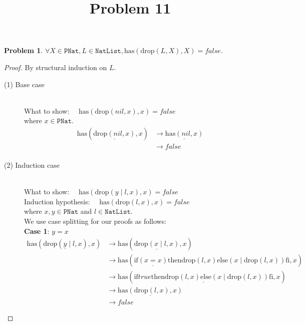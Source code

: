 \documentclass[12pt, a4paper]{article}
\title{Problem 11}
\date{\vspace{-5ex}}
\newtheorem{problem}{Problem}
\newcommand{\rel}[1]{\mathrel{#1}}
\newcommand{\rmx}[1]{\mathrm{#1}}
\newcommand{\larrow}{\longrightarrow}
\newcommand{\under}{\underline}
\begin{document}
\maketitle

\begin{problem}
$\forall X \in \mathtt{PNat}, L \in \mathtt{NatList}, \rmx{has}(\rmx{drop}(L, X), X) = false$.
\end{problem}
\begin{proof}
By structural induction on $L$.

\begin{description}
\item[(1) Base case]~\\
\noindent
What to show: $\quad \rmx{has}(\rmx{drop}(nil, x), x) = false$ \\
where $x \in \mathtt{PNat}$.
\begin{align*}
\rmx{has}(\under{\rmx{drop}(nil, x)}, x)
	&\larrow \under{\rmx{has}(nil, x)} \tag{by drop1} \\
	&\larrow false \tag{by has1} \\
\end{align*}

\item[(2) Induction case]~\\
What to show: $\quad \rmx{has}(\rmx{drop}(y \rel{|} l, x), x) = false$ \\
Induction hypothesis: $\quad \rmx{has}(\rmx{drop}(l, x), x) = false$  \\
where $x, y \in \mathtt{PNat}$ and $l \in \mathtt{NatList}$. \\
We use case splitting for our proofs as follows: \\
\textbf{Case 1}: $y = x$
\begin{align*}
\rmx{has}(\rmx{drop}(\under{y} \rel{|} l, x), x)
	&\larrow \rmx{has}(\under{\rmx{drop}(x \rel{|} l, x)}, x) \tag{by case splitting} \\
	&\larrow \rmx{has}(\rel{\rmx{if}} \under{(x = x)} \rel{\rmx{then}} \rmx{drop}(l, x) \rel{\rmx{else}} (x \rel{|} \rmx{drop}(l, x)) \rel{\rmx{fi}}, x) \tag{by drop2} \\	
	&\larrow \rmx{has}(\under{\rel{\rmx{if}} true \rel{\rmx{then}} \rmx{drop}(l, x) \rel{\rmx{else}} (x \rel{|} \rmx{drop}(l, x)) \rel{\rmx{fi}}}, x) \tag{by equality} \\
	&\larrow \under{\rmx{has}(\rmx{drop}(l, x), x)} \tag{by if1} \\
	&\larrow false \tag{by IH}
\end{align*}


\end{description}
\end{proof}
\end{document}
